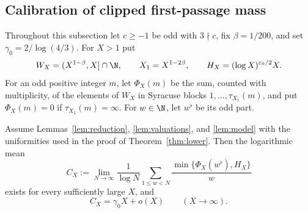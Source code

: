 \subsection*{Calibration of clipped first-passage mass}
\label{subsec:clipped-calibration}
Throughout this subsection let $c\ge-1$ be odd with $3\nmid c$, fix
$\beta=1/200$, and set $\gamma_0=2/\log(4/3)$.
For $X>1$ put
\[
 W_X=(X^{1-\beta},X]\cap\N,\qquad X_1=X^{1-2\beta},\qquad
 H_X=(\log X)^{\varepsilon_0/2}X.
\]
For an odd positive integer $m$, let $\Phi_X(m)$ be the sum, counted
with multiplicity, of the elements of $W_X$ in Syracuse blocks
$1,\ldots,\tau_{X_1}(m)$, and put $\Phi_X(m)=0$ if
$\tau_{X_1}(m)=\infty$. For $w\in\N$, let $w^\flat$ be its odd part.
\begin{proposition}
\label{prop:clipped-calibration}
Assume Lemmas~\ref{lem:reduction}, \ref{lem:valuations}, and
\ref{lem:model} with the uniformities used in the proof of
Theorem~\ref{thm:lower}. Then the logarithmic mean
\[
 C_X:=\lim_{N\to\infty}\frac1{\log N}
 \sum_{1\le w<N}\frac{\min\{\Phi_X(w^\flat),H_X\}}{w}
\]
exists for every sufficiently large $X$, and
\begin{equation}\label{eq:clipped-calibration}
 \boxed{C_X=\gamma_0 X+o(X)\qquad(X\to\infty).}
\end{equation}
\end{proposition}
